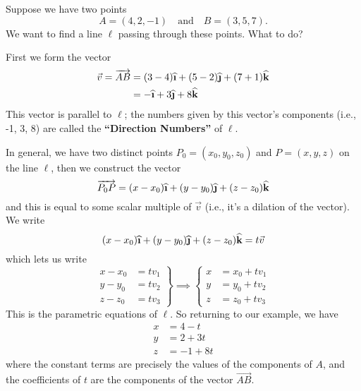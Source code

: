 Suppose we have two points
\begin{equation}
A = (4,2,-1)\quad\mbox{and}\quad
B = (3,5,7).
\end{equation}
We want to find a line $\ell$ passing through these points. What to do?

First we form the vector
\begin{equation}
\begin{aligned}
\vec{v}=\overrightarrow{AB}
&= (3-4)\widehat{\textbf{\i}}+(5-2)\widehat{\textbf{\j}}+(7+1)\widehat{\textbf{k}}\\
&=-\widehat{\textbf{\i}}+3\widehat{\textbf{\j}}+8\widehat{\textbf{k}}
\end{aligned}
\end{equation}
This vector is parallel to $\ell$; the numbers given by this
vector's components (i.e., -1, 3, 8) are called
the \textbf{``Direction Numbers''} of $\ell$.  

In general, we have two distinct points $P_{0}=(x_0,y_0,z_0)$ and
$P=(x,y,z)$ on the line $\ell$, then we construct the vector
\begin{equation}
\overrightarrow{P_{0}P} = (x-x_{0})\widehat{\textbf{\i}}+
(y-y_{0})\widehat{\textbf{\j}}+(z-z_{0})\widehat{\textbf{k}}
\end{equation}
and this is equal to some scalar multiple of $\vec{v}$ (i.e.,
it's a dilation of the vector).  We write
\begin{equation}
(x-x_{0})\widehat{\textbf{\i}}+
(y-y_{0})\widehat{\textbf{\j}}+(z-z_{0})\widehat{\textbf{k}}
=t\vec{v}
\end{equation}
which lets us write
\begin{equation}
\left.\begin{array}{rl}
x-x_{0} &=tv_{1}\\
y-y_{0} &=tv_{2}\\
z-z_{0} &=tv_{3}
\end{array}
\right\}\implies
\left\{\begin{array}{rl}
x &=x_{0}+tv_{1}\\
y &=y_{0}+tv_{2}\\
z &=z_{0}+tv_{3}
\end{array}\right.
\end{equation}
This is the parametric equations of $\ell$. So returning to our
example, we have
\begin{equation}
\begin{aligned}
x &= 4 - t\\
y &= 2 + 3t\\
z &= -1 + 8t
\end{aligned}
\end{equation}
where the constant terms are precisely the values of the
components of $A$, and the coefficients of $t$ are the components
of the vector $\overrightarrow{AB}$.

